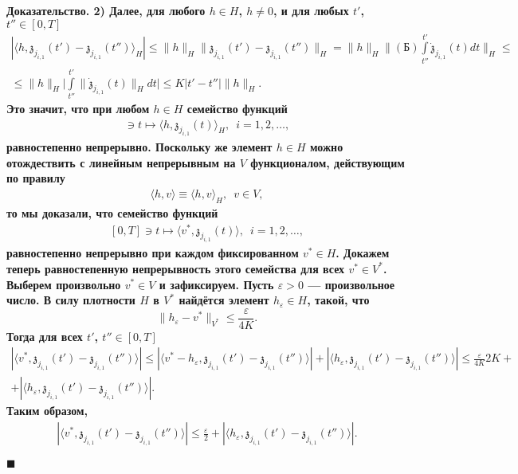\documentclass{report}
\newenvironment{Proof}{\par\noindent\bf Доказательство.\rm}{ $\blacksquare$\par}
\begin{document}
\begin{Proof}
2) Далее, для любого $h\in H$, $h\neq0$, и для любых $t'$, $t''\in[0,T]$
\begin{gather*}
|\langle h,\mathfrak{z}_{j_{i,1}}(t')-\mathfrak{z}_{j_{i,1}}(t'')\rangle_H|\leqslant\|h\|_H\|\mathfrak{z}_{j_{i,1}}(t')-\mathfrak{z}_{j_{i,1}}(t'')\|_H=
\|h\|_H\Biggl\|(\textrm{Б})\int\limits_{t''}^{t'}\dot{\mathfrak{z}}_{j_{i,1}}(t)dt\Biggr\|_H\leqslant\\
\leqslant\|h\|_H\Biggl|\int\limits_{t''}^{t'}\|\dot{\mathfrak{z}}_{j_{i,1}}(t)\|_Hdt\Biggr|\leqslant K|t'-t''|\|h\|_H.
\end{gather*}
Это значит, что при любом $h\in H$ семейство функций
\begin{gather*}
[0,T]\ni t\mapsto\langle h,\mathfrak{z}_{j_{i,1}}(t)\rangle_H,\,\,\,i=1,2,\dots,
\end{gather*}
равностепенно непрерывно. Поскольку же элемент $h\in H$ можно отождествить с линейным непрерывным на $V$ функционалом, действующим по правилу
\begin{gather*}
\langle h,v\rangle\equiv\langle h,v\rangle_H,\,\,\,v\in V,
\end{gather*}
то мы доказали, что семейство функций
\begin{gather}\label{V1120QTcompactness:abstract!m5}
[0,T]\ni t\mapsto\langle v^*,\mathfrak{z}_{j_{i,1}}(t)\rangle,\,\,\,i=1,2,\dots,
\end{gather}
равностепенно непрерывно при каждом фиксированном $v^*\in H$. Докажем теперь равностепенную непрерывность этого семейства для всех $v^*\in V^*$. Выберем произвольно $v^*\in V$ и
зафиксируем. Пусть $\varepsilon>0$ --- произвольное число. В силу плотности $H$ в $V^*$ найдётся элемент $h_\varepsilon\in H$, такой, что
$$
\|h_\varepsilon-v^*\|_{V^*}\leqslant\frac\varepsilon{4K}.
$$
Тогда для всех  $t'$, $t''\in[0,T]$
\begin{gather*}
|\langle v^*,\mathfrak{z}_{j_{i,1}}(t')-\mathfrak{z}_{j_{i,1}}(t'')\rangle|\leqslant|\langle v^*-h_\varepsilon,\mathfrak{z}_{j_{i,1}}(t')-\mathfrak{z}_{j_{i,1}}(t'')\rangle|+
|\langle h_\varepsilon,\mathfrak{z}_{j_{i,1}}(t')-\mathfrak{z}_{j_{i,1}}(t'')\rangle|\leqslant\frac\varepsilon{4K}2K+\\
+|\langle h_\varepsilon,\mathfrak{z}_{j_{i,1}}(t')-\mathfrak{z}_{j_{i,1}}(t'')\rangle|.
\end{gather*}
Таким образом,
\begin{gather*}
|\langle v^*,\mathfrak{z}_{j_{i,1}}(t')-\mathfrak{z}_{j_{i,1}}(t'')\rangle|\leqslant\frac\varepsilon2+|\langle h_\varepsilon,\mathfrak{z}_{j_{i,1}}(t')-\mathfrak{z}_{j_{i,1}}(t'')\rangle|.
\end{gather*}


\end{Proof}
\end{document}
